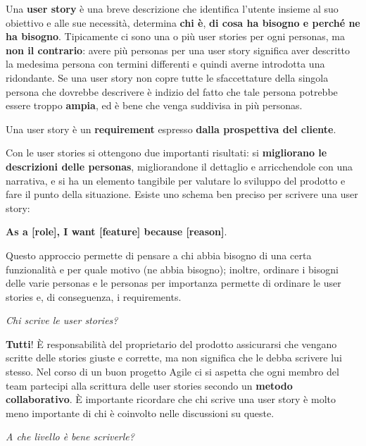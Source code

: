 Una \textbf{user story} è una breve descrizione che identifica l'utente insieme al suo obiettivo e alle sue necessità, determina \textbf{chi è},
\textbf{di cosa ha bisogno e perché ne ha bisogno}. Tipicamente ci sono una o più user stories per ogni personas, ma \textbf{non il contrario}: avere
più personas per una user story significa aver descritto la medesima persona con termini differenti e quindi averne introdotta una ridondante. Se una
user story non copre tutte le sfaccettature della singola persona che dovrebbe descrivere è indizio del fatto che tale persona potrebbe essere
troppo \textbf{ampia}, ed è bene che venga suddivisa in più personas.

Una user story è un \textbf{requirement} espresso \textbf{dalla prospettiva del cliente}.

Con le user stories si ottengono due importanti risultati: si \textbf{migliorano le descrizioni delle personas}, migliorandone il dettaglio e
arricchendole con una narrativa, e si ha un elemento tangibile per valutare lo sviluppo del prodotto e fare il punto della situazione.
Esiste uno schema ben preciso per scrivere una user story:

\begin{center}
	\textbf{\large As a [role], I want [feature] because [reason]}.
\end{center}

Questo approccio permette di pensare a chi abbia bisogno di una certa funzionalità e per quale motivo (ne abbia bisogno); inoltre, ordinare i
bisogni delle varie personas e le personas per importanza permette di ordinare le user stories e, di conseguenza, i requirements.

\begin{flushleft}
	\textit{Chi scrive le user stories?}
\end{flushleft}

\textbf{Tutti}! È responsabilità del proprietario del prodotto assicurarsi che vengano scritte delle stories giuste e corrette, ma non significa che
le debba scrivere lui stesso. Nel corso di un buon progetto Agile ci si aspetta che ogni membro del team partecipi alla scrittura delle user stories
secondo un \textbf{metodo collaborativo}. \`E importante ricordare che chi scrive una user story è molto meno importante di chi è coinvolto nelle
discussioni su queste.

\begin{flushleft}
	\textit{A che livello è bene scriverle?}
\end{flushleft}

